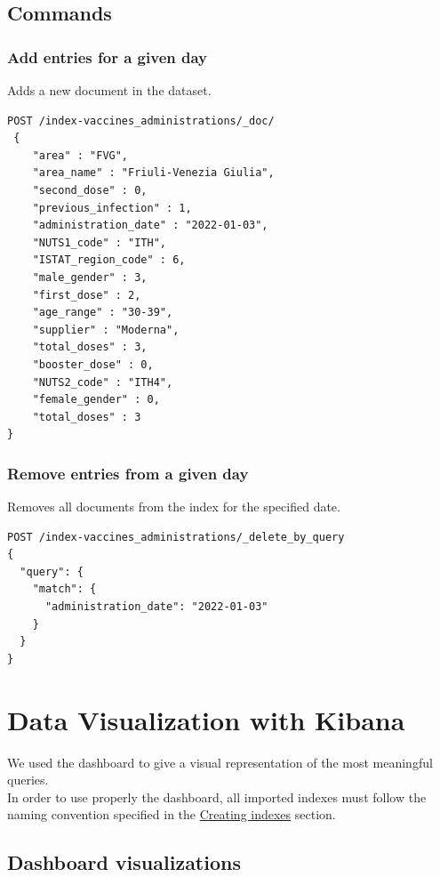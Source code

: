 \documentclass[12pt, a4paper]{article}
\begin{document}
\subsection{Commands}

\subsubsection{Add entries for a given day}
Adds a new document in the dataset.
\begin{tcolorbox}[fontupper=\scriptsize]
  \begin{verbatim}
POST /index-vaccines_administrations/_doc/
 {    
    "area" : "FVG",
    "area_name" : "Friuli-Venezia Giulia",
    "second_dose" : 0,
    "previous_infection" : 1,
    "administration_date" : "2022-01-03",
    "NUTS1_code" : "ITH",
    "ISTAT_region_code" : 6,
    "male_gender" : 3,
    "first_dose" : 2,
    "age_range" : "30-39",
    "supplier" : "Moderna",
    "total_doses" : 3,
    "booster_dose" : 0,
    "NUTS2_code" : "ITH4",
    "female_gender" : 0,
    "total_doses" : 3
}
  \end{verbatim}
\end{tcolorbox}

\subsubsection{Remove entries from a given day}
Removes all documents from the index for the specified date.
\begin{tcolorbox}[fontupper=\scriptsize]
  \begin{verbatim}
POST /index-vaccines_administrations/_delete_by_query
{
  "query": {
    "match": {
      "administration_date": "2022-01-03"
    }
  }
}
  \end{verbatim}
\end{tcolorbox}

\clearpage

\section{Data Visualization with Kibana}

We used the dashboard to give a visual representation of the most meaningful queries. \\
In order to use properly the dashboard, all imported indexes must follow the naming 
convention specified in the \hyperref[sec:indexes]{Creating indexes} section.

\subsection{Dashboard visualizations}
\end{document}
